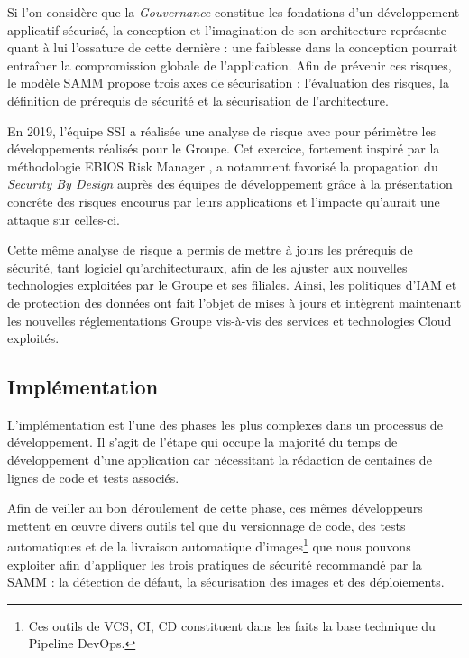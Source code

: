 Si l'on considère que la \emph{Gouvernance} constitue les fondations d'un développement applicatif sécurisé, la 
conception et l'imagination de son architecture représente quant à lui l'ossature de cette dernière : une faiblesse dans 
la conception pourrait entraîner la compromission globale de l'application. 
\newline Afin de prévenir ces risques, le modèle \ac{SAMM} propose trois axes de sécurisation : l'évaluation des risques, 
la définition de prérequis de sécurité et la sécurisation de l'architecture.

En 2019, l'équipe \ac{SSI} a réalisée une analyse de risque avec pour périmètre les développements réalisés pour le 
Groupe. 
Cet exercice, fortement inspiré par la méthodologie EBIOS Risk Manager \autocite{ebios_rm_anssi_2018}, a notamment 
favorisé la propagation du \emph{Security By Design} auprès des équipes de développement grâce à la présentation concrête
des risques encourus par leurs applications et l'impacte qu'aurait une attaque sur celles-ci.

Cette même analyse de risque a permis de mettre à jours les prérequis de sécurité, tant logiciel qu'architecturaux, afin 
de les ajuster aux nouvelles technologies exploitées par le Groupe et ses filiales. Ainsi, les politiques d’\ac{IAM}
et de protection des données ont fait l’objet de mises à jours et intègrent maintenant les nouvelles réglementations 
Groupe vis-à-vis des services et technologies Cloud exploités.

\subsection{Implémentation}

L'implémentation est l'une des phases les plus complexes dans un processus de développement. Il s'agit de l'étape
qui occupe la majorité du temps de développement d'une application car nécessitant la rédaction de centaines de lignes 
de code et tests associés.

Afin de veiller au bon déroulement de cette phase, ces mêmes développeurs mettent en œuvre divers outils tel que du 
versionnage de code, des tests automatiques et de la livraison automatique d'images\footnote{Ces outils de \ac{VCS}, 
\ac{CI}, \ac{CD} constituent dans les faits la base technique du Pipeline DevOps.} que nous pouvons exploiter afin 
d'appliquer les trois pratiques de sécurité recommandé par la \ac{SAMM} : la détection de défaut, la sécurisation des 
images et des déploiements.

